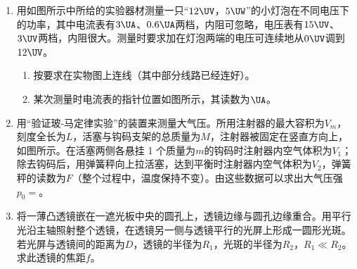 \documentclass[\gkver]{gaokaozhenti}
\begin{document}
\begin{enumerate}
\item
用如图所示中所给的实验器材测量一只“$12\UV$，$5\UW$”的小灯泡在不同电压下的功率，其中电流表有$3\UA$、$0.6\UA$两档，内阻可忽略，电压表有$15\UV$、$3\UV$两档，内阻很大。测量时要求加在灯泡两端的电压可连续地从$0\UV$调到$12\UV$。
\begin{enumerate}
	\item
	按要求在实物图上连线（其中部分线路已经连好）。
	\item
	某次测量时电流表的指针位置如图所示，其读数为$\UA$。
\end{enumerate}

\item
用“验证玻-马定律实验”的装置来测量大气压。所用注射器的最大容积为$V_{m}$，刻度全长为$L$，活塞与钩码支架的总质量为$M$，注射器被固定在竖直方向上，如图所示。在活塞两侧各悬挂 1 个质量为$m$的钩码时注射器内空气体积为$V_{1}$；除去钩码后，用弹簧秤向上拉活塞，达到平衡时注射器内空气体积为$V_{2}$，弹簧秤的读数为$F$（整个过程中，温度保持不变）。由这些数据可以求出大气压强$p_{0}=$。

\item
将一薄凸透镜嵌在一遮光板中央的圆孔上，透镜边缘与圆孔边缘重合。用平行光沿主轴照射整个透镜，在透镜另一侧与透镜平行的光屏上形成一圆形光斑。若光屏与透镜间的距离为$D$，透镜的半径为$R_{1}$，光斑的半径为$R_{2}$，$R_{1}\ll R_{2}$。求此透镜的焦距$f$。
\end{enumerate}
\end{document}
